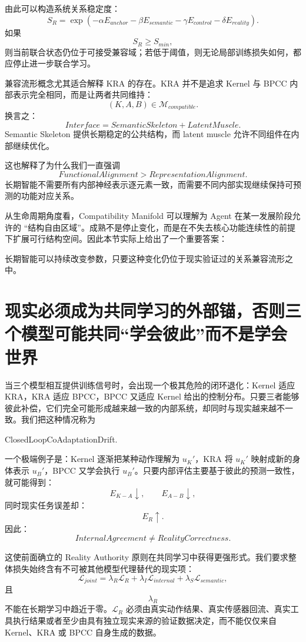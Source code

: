 由此可以构造系统关系稳定度：
\[
S_R
=
\exp
\left(
-
\alpha E_{anchor}
-
\beta E_{semantic}
-
\gamma E_{control}
-
\delta E_{reality}
\right).
\]
如果
\[
S_R\geq S_{min},
\]
则当前联合状态仍位于可接受兼容域；若低于阈值，则无论局部训练损失如何，都应停止进一步联合学习。

兼容流形概念尤其适合解释 KRA 的存在。KRA 并不是追求 Kernel 与 BPCC 内部表示完全相同，而是让两者共同维持：
\[
(K,A,B)\in\mathcal M_{compatible}.
\]
换言之：
\[
\boxed{
Interface=SemanticSkeleton+LatentMuscle.
}
\]
Semantic Skeleton 提供长期稳定的公共结构，而 latent muscle 允许不同组件在内部继续优化。

这也解释了为什么我们一直强调
\[
\boxed{
FunctionalAlignment
>
RepresentationAlignment.
}
\]
长期智能不需要所有内部神经表示逐元素一致，而需要不同内部实现继续保持可预测的功能对应关系。

从生命周期角度看，Compatibility Manifold 可以理解为 Agent 在某一发展阶段允许的 ``结构自由区域''。成熟不是停止变化，而是在不失去核心功能连续性的前提下扩展可行结构空间。因此本节实际上给出了一个重要答案：
\begin{statementbox}
长期智能可以持续改变参数，只要这种变化仍位于现实验证过的关系兼容流形之中。
\end{statementbox}

\section{现实必须成为共同学习的外部锚，否则三个模型可能共同“学会彼此”而不是学会世界}

当三个模型相互提供训练信号时，会出现一个极其危险的闭环退化：Kernel 适应 KRA，KRA 适应 BPCC，BPCC 又适应 Kernel 给出的控制分布。只要三者能够彼此补偿，它们完全可能形成越来越一致的内部系统，却同时与现实越来越不一致。我们把这种情况称为
\begin{statementbox}
ClosedLoopCoAdaptationDrift.
\end{statementbox}

一个极端例子是：Kernel 逐渐把某种动作理解为 $u_K'$，KRA 将 $u_K'$ 映射成新的身体表示 $u_B'$，BPCC 又学会执行 $u_B'$。只要内部评估主要基于彼此的预测一致性，就可能得到：
\[
E_{K-A}\downarrow,
\qquad
E_{A-B}\downarrow,
\]
同时现实任务误差却：
\[
E_R\uparrow.
\]
因此：
\[
\boxed{
InternalAgreement
\neq
RealityCorrectness.
}
\]

这使前面确立的 Reality Authority 原则在共同学习中获得更强形式。我们要求整体损失始终含有不可被其他模型代理替代的现实项：
\[
\mathcal L_{joint}
=
\lambda_R\mathcal L_R
+
\lambda_I\mathcal L_{internal}
+
\lambda_S\mathcal L_{semantic},
\]
且
\[
\lambda_R
\]
不能在长期学习中趋近于零。$\mathcal L_R$ 必须由真实动作结果、真实传感器回流、真实工具执行结果或者至少由具有独立现实来源的验证数据决定，而不能仅仅来自 Kernel、KRA 或 BPCC 自身生成的数据。

